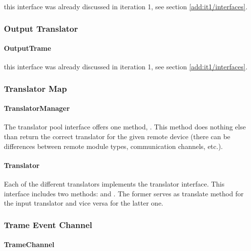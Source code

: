 \npar this interface was already discussed in iteration 1, see section
\ref{add:it1/interfaces}.

\subsubsection{Output Translator}

\paragraph{OutputTrame}

\npar this interface was already discussed in iteration 1, see section
\ref{add:it1/interfaces}.

\subsubsection{Translator Map}

\paragraph{TranslatorManager}

\npar The translator pool interface offers one method,
. This method does nothing
else than return the correct translator for the given remote device (there can be
differences between remote module types, communication channels, etc.).

\paragraph{Translator}

\npar Each of the different translators implements the 
translator interface. This interface includes two methods:
 and
. The former serves as translate
method for the input translator and vice versa for the latter one.

\subsubsection{Trame Event Channel}

\paragraph{TrameChannel} %


